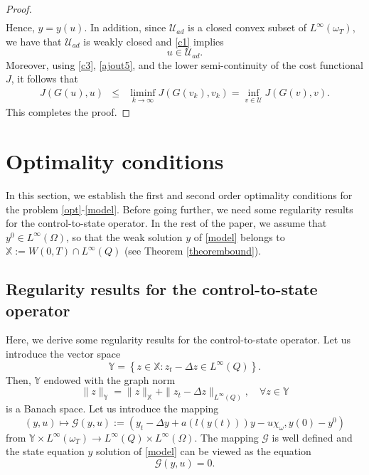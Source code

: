 \documentclass[reqno,twoside]{amsart}
\numberwithin{equation}{section}
\theoremstyle{definition}
\numberwithin{equation}{section}
\def \dis {\displaystyle}
\def \U {{\mathcal U}}
\def \U {\mathcal{U}}
\begin{document}
\begin{proof}
\begin{equation}
\begin{array}{lll}
	\end{array}
\end{equation}
Hence, $y=y(u)$. In addition, since $\U_{ad}$ is a closed convex subset of $L^\infty(\omega_T)$, we have that $\U_{ad}$ is weakly closed and \eqref{c1} implies
\begin{equation}\label{ajout5}
	u\in \U_{ad}.
\end{equation}
Moreover, using \eqref{c3}, \eqref{ajout5}, and the lower semi-continuity of the cost functional $J$, it follows that
\begin{eqnarray*}
	J(G(u),u)&\leq &\liminf_{k\to \infty}J(G(v_k),v_k)=\inf_{v\in\U}J(G(v),v).
\end{eqnarray*}	
This completes the proof.		
\end{proof}



\section{Optimality conditions}\label{sec-5}
In this section, we establish the first and second order optimality conditions for the problem \eqref{opt}-\eqref{model}. 	
Before going further, we need some regularity results for the control-to-state operator.
In the rest of the paper, we assume that $y^0\in L^\infty(\Omega)$, so that the weak solution $y$ of \eqref{model} belongs to $\mathbb{X}:=W(0,T)\cap L^\infty(Q)$ (see Theorem \ref{theorembound}).
\subsection{Regularity results for the control-to-state operator}
Here, we derive some regularity results for the control-to-state operator. Let us introduce the vector space
\begin{equation}\label{space1}
\mathbb{Y}=\left\{z\in \mathbb{ X}: \dis z_{t}-\Delta z\in L^\infty(Q) \right\}.
\end{equation}
Then,  $\mathbb{ Y}$ endowed with the graph norm
\begin{equation}\label{norm1}
\|z\|_{\mathbb{ Y}}=\|z\|_{\mathbb{ X}}+\|z_{t}-\Delta z\|_{L^{\infty}(Q)},\quad\forall z\in \mathbb{Y}
\end{equation}
is a Banach space.
Let us introduce the mapping
\begin{equation}\label{defG}
(y, u)\mapsto\mathcal{G}(y,u):= (\dis y_{t}-\Delta y+a\left(l(y(t))\right)y -u\chi_{\omega},y(0)-y^0)
\end{equation}
from $ \mathbb{ Y}\times L^\infty(\omega_T)\to L^\infty(Q)\times L^\infty(\Omega).$ The mapping $\mathcal{G}$ is well defined and  the state equation $y$ solution of \eqref{model} can be viewed as the equation
\begin{equation}\label{eqG}
\mathcal{G}(y,u)=0.
\end{equation}
\end{document}
